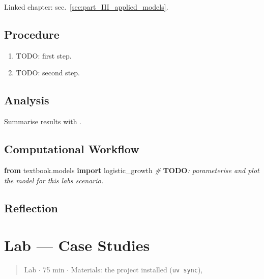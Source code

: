 \documentclass[
]{article}
\newenvironment{Shaded}{}{}
\newcommand{\AlertTok}[1]{\textcolor[rgb]{1.00,0.00,0.00}{\textbf{#1}}}
\newcommand{\CommentTok}[1]{\textcolor[rgb]{0.38,0.63,0.69}{\textit{#1}}}
\newcommand{\ImportTok}[1]{\textcolor[rgb]{0.00,0.50,0.00}{\textbf{#1}}}
\newcommand{\NormalTok}[1]{#1}
\theoremstyle{plain}
\theoremstyle{definition}
\begin{document}
Linked chapter: sec.~\ref{sec:part_III_applied_models}.

\subsection{Procedure}\label{procedure-9}

\begin{enumerate}
\def\labelenumi{\arabic{enumi}.}
\item
  TODO: first step.
\item
  TODO: second step.
\end{enumerate}

\subsection{Analysis}\label{analysis-9}

Summarise results with .

\subsection{Computational Workflow}\label{computational-workflow-9}

\begin{Shaded}
\begin{Highlighting}[]
\ImportTok{from}\NormalTok{ textbook.models }\ImportTok{import}\NormalTok{ logistic\_growth}
\CommentTok{\# }\AlertTok{TODO}\CommentTok{: parameterise and plot the model for this lab\textquotesingle{}s scenario.}
\end{Highlighting}
\end{Shaded}

\subsection{Reflection}\label{reflection-9}

\newpage

\section{Lab --- Case Studies}\label{sec:lab_part_III_case_studies}

\begin{quote}
Lab \texorpdfstring{\ensuremath{\cdot}}{.} 75 min \texorpdfstring{\ensuremath{\cdot}}{.} Materials: the project installed (\texttt{uv\ sync}),
\end{quote}
\end{document}

